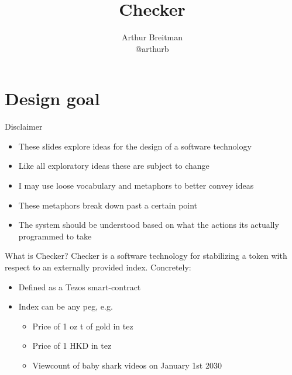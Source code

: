 \documentclass[handout]{beamer}
\title{Checker}
\author[@arthurb]{Arthur Breitman\\@arthurb}
\newcommand{\yel}[
  1]{{\color{yellow} #1}}
\begin{document}
\maketitle





\section{Design goal}

\begin{frame}{Disclaimer}
  \begin{itemize}
  \item These slides explore ideas for the design of a software \yel{technology}
  \item Like all exploratory ideas these are subject to change
  \item I may use \yel{loose vocabulary} and \yel{metaphors} to better convey ideas
  \item These \yel{metaphors} break down past a certain point
  \item The system should be understood based on what the actions its actually
    programmed to take
  \end{itemize}
\end{frame}

\begin{frame}{What is Checker?}
  \yel{Checker} is a \yel{software} technology for stabilizing a token with respect to an externally provided index.
  Concretely:
  \begin{itemize}
  \item Defined as a Tezos smart-contract
  \item Index can be any peg, e.g.
    \begin{itemize}
    \item Price of 1 oz t of gold in tez
    \item Price of 1 HKD in tez
    \item Viewcount of baby shark videos on January 1st 2030
    \end{itemize}
  \end{itemize}  
\end{frame}
\end{document}
